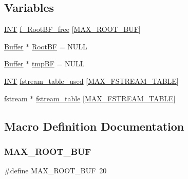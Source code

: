 \subsection*{Variables}
\begin{DoxyCompactItemize}
\item 
\mbox{\hyperlink{galois_8h_a09fddde158a3a20bd2dcadb609de11dc}{I\+NT}} \mbox{\hyperlink{btree_8_c_abd88cf614f93d973c7f3701df4a2eb1c}{f\+\_\+\+Root\+B\+F\+\_\+free}} \mbox{[}\mbox{\hyperlink{btree_8_c_a123ee60d971b70c612e19242dab45322}{M\+A\+X\+\_\+\+R\+O\+O\+T\+\_\+\+B\+UF}}\mbox{]}
\item 
\mbox{\hyperlink{discreta_8h_a4966414b761cd8d10ba385fe5e7c07fc}{Buffer}} $\ast$ \mbox{\hyperlink{btree_8_c_a0ef20fe00d12a820e7fc8c8523f32f68}{Root\+BF}} = N\+U\+LL
\item 
\mbox{\hyperlink{discreta_8h_a4966414b761cd8d10ba385fe5e7c07fc}{Buffer}} $\ast$ \mbox{\hyperlink{btree_8_c_afd4515a2689560d6fcc14762a331ca77}{tmp\+BF}} = N\+U\+LL
\item 
\mbox{\hyperlink{galois_8h_a09fddde158a3a20bd2dcadb609de11dc}{I\+NT}} \mbox{\hyperlink{btree_8_c_acc826f47de728e135fe1aba12a72961d}{fstream\+\_\+table\+\_\+used}} \mbox{[}\mbox{\hyperlink{discreta_8h_a18fb5f2cbd887c2e3c5bb322572b5bf3}{M\+A\+X\+\_\+\+F\+S\+T\+R\+E\+A\+M\+\_\+\+T\+A\+B\+LE}}\mbox{]}
\item 
fstream $\ast$ \mbox{\hyperlink{btree_8_c_a50c0eb84789d93e76c0499b6d3d9168e}{fstream\+\_\+table}} \mbox{[}\mbox{\hyperlink{discreta_8h_a18fb5f2cbd887c2e3c5bb322572b5bf3}{M\+A\+X\+\_\+\+F\+S\+T\+R\+E\+A\+M\+\_\+\+T\+A\+B\+LE}}\mbox{]}
\end{DoxyCompactItemize}


\subsection{Macro Definition Documentation}
\mbox{\label{btree_8_c_a123ee60d971b70c612e19242dab45322}} 
\subsubsection{\texorpdfstring{M\+A\+X\+\_\+\+R\+O\+O\+T\+\_\+\+B\+UF}{MAX\_ROOT\_BUF}}
{\footnotesize\ttfamily \#define M\+A\+X\+\_\+\+R\+O\+O\+T\+\_\+\+B\+UF~20}

